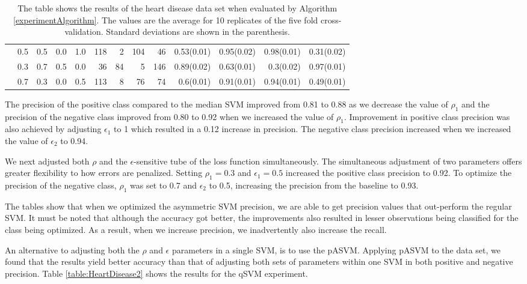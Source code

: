 \documentclass[twoside,11pt]{article}
\begin{document}
\begin{table}[htp]
\begin{tabular}{rrrrr|rrrrrrrr}
      & 0.5   & 0.5   & 0.0   & 1.0   & 118   & 2     & 104   & 46    & 0.53(0.01) & 0.95(0.02) & 0.98(0.01) & 0.31(0.02) \\
      & 0.3   & 0.7   & 0.5   & 0.0   & 36    & 84    & 5     & 146   & 0.89(0.02) & 0.63(0.01) & 0.3(0.02) & 0.97(0.01) \\
      & 0.7   & 0.3   & 0.0   & 0.5   & 113   & 8     & 76    & 74    & 0.6(0.01) & 0.91(0.01) & 0.94(0.01) & 0.49(0.01) \bigstrut[b]\\
\hline
\hline
    \end{tabular}%
  \caption{The table shows the results of the heart disease data set when evaluated by Algorithm \ref{experimentAlgorithm}. The values are the average for 10 replicates of the five fold cross-validation. Standard deviations are shown in the parenthesis.
  }
\end{table}\label{table:HeartDisease1}

The precision of the positive class compared to the median SVM improved from 0.81 to 0.88 as we decrease the value of $\rho_1$ and the precision of the negative class improved from 0.80 to 0.92 when we increased the value of $\rho_1$. Improvement in positive class precision was also achieved by adjusting $\epsilon_1$ to 1 which resulted in a 0.12 increase in precision. The negative class precision increased when we increased the value of $\epsilon_2$ to 0.94. 


We next adjusted both $\rho$ and the $\epsilon$-sensitive tube of the loss function simultaneously. The simultaneous adjustment of two parameters offers greater flexibility to how errors are penalized. Setting $\rho_1=0.3$ and $\epsilon_1=0.5$ increased the positive class precision to 0.92. To optimize the precision of the negative class, $\rho_1$ was set to 0.7 and $\epsilon_2$ to 0.5, increasing the precision from the baseline to 0.93. 

The tables show that when we optimized the asymmetric SVM precision, we are able to get precision values that out-perform the regular SVM. It must be noted that although the accuracy got better, the improvements also resulted in lesser observations being classified for the class being optimized. As a result, when we increase precision, we inadvertently also increase the recall. 

An alternative to adjusting both the $\rho$ and $\epsilon$ parameters in a single SVM, is to use the pASVM. Applying pASVM to the data set, we found that the results yield better accuracy than that of adjusting both sets of parameters within one SVM in both positive and negative precision. Table \ref{table:HeartDisease2} shows the results for the qSVM experiment. 
\end{document}
